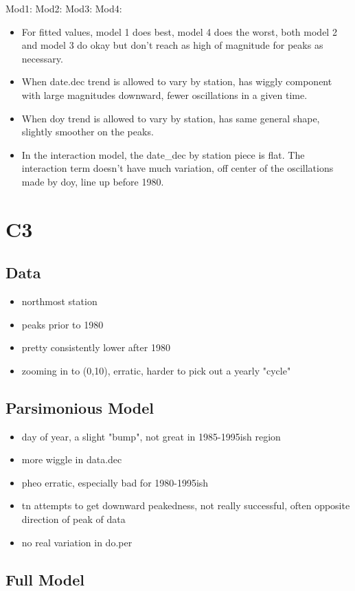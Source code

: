 \documentclass[12pt]{amsart}
\begin{document}
Mod1:
Mod2:
Mod3:
Mod4:

\begin{itemize}
\item For fitted values, model 1 does best, model 4 does the worst, both model 2 and model 3 do okay but don't reach as high of magnitude for peaks as necessary.
\item When date.dec trend is allowed to vary by station, has wiggly component with large magnitudes downward, fewer oscillations in a given time.
\item When doy trend is allowed to vary by station, has same general shape, slightly smoother on the peaks. 
\item In the interaction model, the date_dec by station piece is flat. The interaction term doesn't have much variation, off center of the oscillations made by doy, line up before 1980. 
\end{itemize}

\section{C3}
\subsection{Data}
\begin{itemize}
\item northmost station
\item peaks prior to 1980
\item pretty consistently lower after 1980
\item zooming in to (0,10), erratic, harder to pick out a yearly "cycle"
\end{itemize}
\subsection{Parsimonious Model}
\begin{itemize}
\item day of year, a slight "bump", not great in 1985-1995ish region
\item more wiggle in data.dec
\item pheo erratic, especially bad for 1980-1995ish
\item tn attempts to get downward peakedness, not really successful, often opposite direction of peak of data
\item no real variation in do.per
\end{itemize}
\subsection{Full Model}
\end{document}
